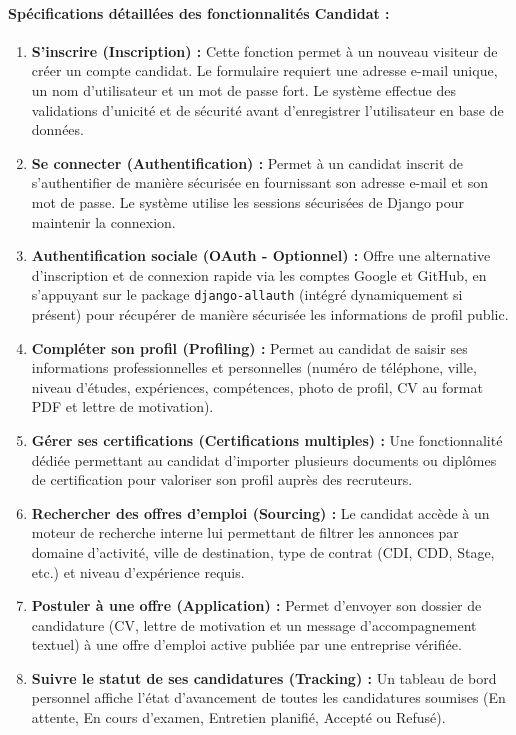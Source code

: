 \paragraph{Spécifications détaillées des fonctionnalités Candidat :}
\begin{enumerate}
    \item \textbf{S'inscrire (Inscription) :} Cette fonction permet à un nouveau visiteur de créer un compte candidat. Le formulaire requiert une adresse e-mail unique, un nom d'utilisateur et un mot de passe fort. Le système effectue des validations d'unicité et de sécurité avant d'enregistrer l'utilisateur en base de données.
    \item \textbf{Se connecter (Authentification) :} Permet à un candidat inscrit de s'authentifier de manière sécurisée en fournissant son adresse e-mail et son mot de passe. Le système utilise les sessions sécurisées de Django pour maintenir la connexion.
    \item \textbf{Authentification sociale (OAuth - Optionnel) :} Offre une alternative d'inscription et de connexion rapide via les comptes Google et GitHub, en s'appuyant sur le package \texttt{django-allauth} (intégré dynamiquement si présent) pour récupérer de manière sécurisée les informations de profil public.
    \item \textbf{Compléter son profil (Profiling) :} Permet au candidat de saisir ses informations professionnelles et personnelles (numéro de téléphone, ville, niveau d'études, expériences, compétences, photo de profil, CV au format PDF et lettre de motivation).
    \item \textbf{Gérer ses certifications (Certifications multiples) :} Une fonctionnalité dédiée permettant au candidat d'importer plusieurs documents ou diplômes de certification pour valoriser son profil auprès des recruteurs.
    \item \textbf{Rechercher des offres d'emploi (Sourcing) :} Le candidat accède à un moteur de recherche interne lui permettant de filtrer les annonces par domaine d'activité, ville de destination, type de contrat (CDI, CDD, Stage, etc.) et niveau d'expérience requis.
    \item \textbf{Postuler à une offre (Application) :} Permet d'envoyer son dossier de candidature (CV, lettre de motivation et un message d'accompagnement textuel) à une offre d'emploi active publiée par une entreprise vérifiée.
    \item \textbf{Suivre le statut de ses candidatures (Tracking) :} Un tableau de bord personnel affiche l'état d'avancement de toutes les candidatures soumises (En attente, En cours d'examen, Entretien planifié, Accepté ou Refusé).

\end{enumerate}
